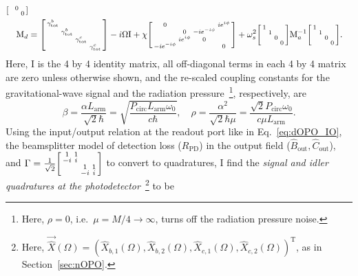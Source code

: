 \begin{align}
\begin{bsmallmatrix}
 &  & 0 &  \\
 &  &  & 0
\end{bsmallmatrix}\\
\text{M}_d&=\begin{bsmallmatrix}
\gamma^b_\mathrm{tot} &  &  &  \\
 & \gamma^b_\mathrm{tot} &  &  \\
 &  & \gamma^c_\mathrm{tot} &  \\
 &  &  & \gamma^c_\mathrm{tot} 
\end{bsmallmatrix}-i\Omega \text{I}+\chi \begin{bsmallmatrix}
0 &  &  & i e^{i\phi} \\
 & 0 & -i e^{-i\phi} &  \\
 & i e^{i\phi} & 0 &  \\
-i e^{-i\phi} &  &  & 0
\end{bsmallmatrix}+\omega_s^2\begin{bsmallmatrix}
1 &  &  &  \\
 & 1 &  &  \\
 &  & 0 &  \\
 &  &  & 0
\end{bsmallmatrix}\text{M}_a^{-1}\begin{bsmallmatrix}
1 &  &  &  \\
 & 1 &  &  \\
 &  & 0 &  \\
 &  &  & 0
\end{bsmallmatrix}.
\end{align}
\endgroup
Here, $\text{I}$ is the 4 by 4 identity matrix, all off-diagonal terms in each 4 by 4 matrix are zero unless otherwise shown, and the re-scaled coupling constants for the gravitational-wave signal and the radiation pressure~\footnote{Here, $\rho=0$, i.e.\ $\mu=M/4\rightarrow\infty$, turns off the radiation pressure noise.}, respectively, are
\begin{equation}\label{eq:beta_and_rho}
\beta = \frac{\alpha L_\mathrm{arm}}{\sqrt{2}\hbar}=\sqrt{\frac{ P_\text{circ}L_\text{arm} \omega_0 }{c  \hbar}},\quad \rho = \frac{\alpha^2}{\sqrt{2}\hbar\mu}=\frac{\sqrt{2} P_\text{circ} \omega_0}{c \mu L_\text{arm}}.
\end{equation}
Using the input/output relation at the readout port like in Eq.~\ref{eq:dOPO_IO}, the beamsplitter model of detection loss ($R_\text{PD}$) in the output field ($\hat{B}_\text{out}, \hat{C}_\text{out}$), and $\Gamma= \frac{1}{\sqrt2}\begin{bsmallmatrix}
1 & 1 &  &  \\
-i & i &  &  \\
 &  & 1 & 1 \\
 &  & -i & i
\end{bsmallmatrix}$ to convert to quadratures, I find the \emph{signal and idler quadratures at the photodetector}~\footnote{Here, $\vec{\hat X}(\Omega)=(\hat X_{b,1}(\Omega),\hat X_{b,2}(\Omega),\hat X_{c,1}(\Omega),\hat X_{c,2}(\Omega))^\text{T}$, as in Section~\ref{sec:nOPO}.} to be
